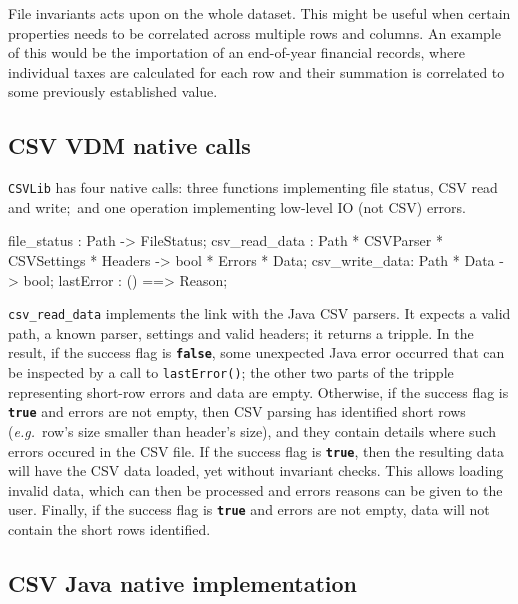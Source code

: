 \documentclass[runningheads,a4paper]{llncs}
\begin{document}
File invariants acts upon on the whole dataset. This might be useful when certain properties needs to be correlated across multiple rows and columns. An example of this would be the importation of an end-of-year financial records, where individual taxes are calculated for each row and their summation is correlated to some previously established value. 

\subsection*{CSV VDM native calls}\label{subsec:VDMnative}

\texttt{CSVLib} has four native calls: three functions implementing file status, CSV read and write;~and one operation implementing low-level IO (not CSV) errors.   
%
\begin{vdmsl}[frame=none,basicstyle=\ttfamily\scriptsize]
    file_status   : Path -> FileStatus;
    csv_read_data : Path * CSVParser * CSVSettings * Headers -> 
                    bool * Errors * Data;
    csv_write_data: Path * Data -> bool;
    lastError     : () ==> Reason;
\end{vdmsl} 

\texttt{csv\_read\_data} implements the link with the Java CSV parsers. It expects a valid path, a known parser, settings and valid headers; it returns a tripple. In the result, if the success flag is \texttt{\textbf{false}}, some unexpected Java error occurred that can be inspected by a call to \texttt{lastError()}; the other two parts of the tripple representing short-row errors and data are empty. Otherwise, if the success flag is \texttt{\textbf{true}} and errors are not empty, then CSV parsing has identified short rows (\textit{e.g.}~row's size smaller than header's size), and they contain details where such errors occured in the CSV file. If the success flag is \texttt{\textbf{true}}, then the resulting data will have the CSV data loaded, yet without invariant checks. This allows loading invalid data, which can then be processed and errors reasons can be given to the user. Finally, if the success flag is \texttt{\textbf{true}} and errors are not empty, data will not contain the short rows identified.        

\subsection*{CSV Java native implementation}\label{subsec:JavaNative}
\end{document}
